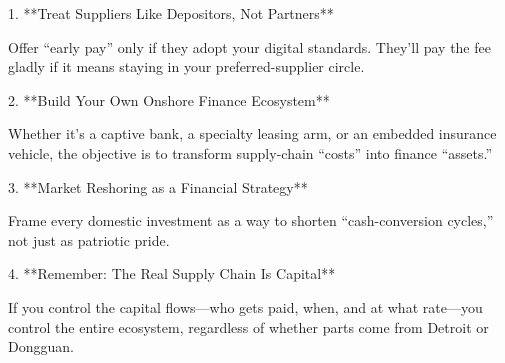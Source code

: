 1. **Treat Suppliers Like Depositors, Not Partners**

   Offer “early pay” only if they adopt your digital standards. They’ll pay the fee gladly if it means staying in your preferred-supplier circle.

2. **Build Your Own Onshore Finance Ecosystem**

   Whether it’s a captive bank, a specialty leasing arm, or an embedded insurance vehicle, the objective is to transform supply-chain “costs” into finance “assets.”

3. **Market Reshoring as a Financial Strategy**

   Frame every domestic investment as a way to shorten “cash-conversion cycles,” not just as patriotic pride.

4. **Remember: The Real Supply Chain Is Capital**

   If you control the capital flows—who gets paid, when, and at what rate—you control the entire ecosystem, regardless of whether parts come from Detroit or Dongguan.
